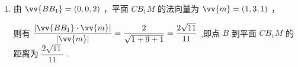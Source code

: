 \begin{enumerate}
\begin{jieda}
\begin{enumerate}
            $A\left( {0,0,0}\right)$ 、 $B\left( {2,0,0}\right)$ 、 ${B}_{1}\left( {2,0,2}\right)$ 、 $M\left( {0,1,1}\right)$ 、 $C\left( {1,1,0}\right)$ 、 ${C}_{1}\left( {1,1,2}\right)$

            $\vv{C{B}_{1}} = \left( {1, - 1,2}\right) \text{ 、 }\vv{CM} = \left( {-1,0,1}\right) \text{ 、 }\vv{B{B}_{1}} = \left( {0,0,2}\right)$

            设平面 $C{B}_{1}M$ 与平面 $B{B}_{1}C{C}_{1}$ 的法向量分别为 $\vv{m} = \left( {{x}_{1},{y}_{1},{z}_{1}}\right) \text{ 、 }\vv{n} = \left( {{x}_{2},{y}_{2},{z}_{2}}\right)$ ,

            则有 $\left\{  \begin{array}{l} \vv{m} \cdot  \vv{C{B}_{1}} = {x}_{1} - {y}_{1} + 2{z}_{1} = 0 \\  \vv{m} \cdot  \vv{CM} =  - {x}_{1} + {z}_{1} = 0 \end{array}\right.$ , $\left\{  \begin{array}{l} \vv{n} \cdot  \vv{C{B}_{1}} = {x}_{2} - {y}_{2} + 2{z}_{2} = 0 \\  \vv{n} \cdot  \vv{B{B}_{1}} = 2{z}_{2} = 0 \end{array}\right.$ ,

            分别取 ${x}_{1} = {x}_{2} = 1$ ,则有 ${y}_{1} = 3\text{ 、 }{z}_{1} = 1\text{ 、 }{y}_{2} = 1,{z}_{2} = 0$ ,即 $\vv{m} = \left( {1,3,1}\right) \text{ 、 }\vv{n} = \left( {1,1,0}\right)$ ,

            则 $\cos \vv{m},\vv{n} = \dfrac{\vv{m} \cdot  \vv{n}}{\left| \vv{m}\right|  \cdot  \left| \vv{n}\right| } = \dfrac{1 + 3}{\sqrt{1 + 9 + 1} \cdot  \sqrt{1 + 1}} = \dfrac{2\sqrt{22}}{11}$ ,故平面 $C{B}_{1}M$ 与平面 $B{B}_{1}C{C}_{1}$ 的夹角余弦值为 $\dfrac{2\sqrt{22}}{11}$ ;

            \item 由 $\vv{B{B}_{1}} = \left( {0,0,2}\right)$ ，平面 $C{B}_{1}M$ 的法向量为 $\vv{m} = \left( {1,3,1}\right)$ ，

            则有 $\dfrac{\left| \vv{B{B}_{1}} \cdot  \vv{m}\right| }{\left| \vv{m}\right| } = \dfrac{2}{\sqrt{1 + 9 + 1}} = \dfrac{2\sqrt{11}}{11}$ ,即点 $B$ 到平面 $C{B}_{1}M$ 的距离为 $\dfrac{2\sqrt{11}}{11}$ .

        \end{enumerate}
    \end{jieda}


\end{enumerate}
